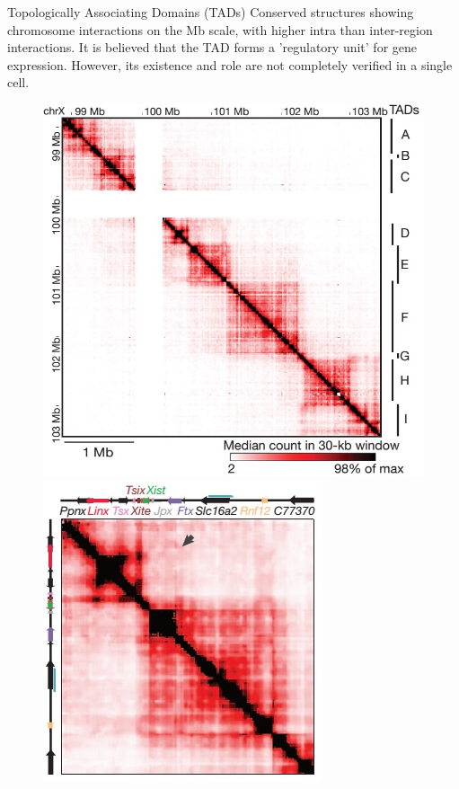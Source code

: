 \documentclass[8pt]{beamer}
\begin{document}
\begin{frame}{Topologically Associating Domains (TADs)}
Conserved structures showing chromosome interactions on the Mb scale, with higher intra than inter-region interactions.
It is believed that the TAD forms a 'regulatory unit' for gene expression.
However, its existence and role are not completely verified in a single cell.
\centering
\begin{figure}[H]
\includegraphics[scale=0.2]{TADsOfTheXChromosome_NoraEtAl2012}
\quad
\includegraphics[scale=0.25]{TadDandENoraEtAl2012} 
\quad

\end{figure}
\end{frame}
\end{document}
